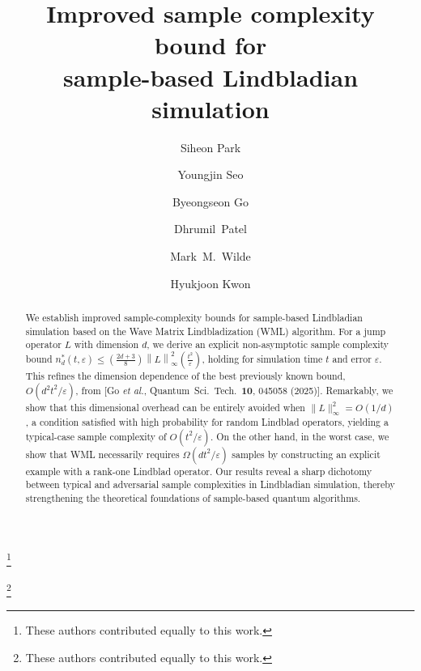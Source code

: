 \documentclass[superscriptaddress,amsmath,amssymb,aps,pra,letterpaper,tightenlines,notitlepages,12pt]{revtex4-2}
\begin{document}
\title{Improved sample complexity bound for\\sample-based Lindbladian simulation}

\author{Siheon Park}
\thanks{These authors contributed equally to this work.}

\author{Youngjin Seo}
\thanks{These authors contributed equally to this work.}

\author{Byeongseon Go}

\author{Dhrumil~Patel}

\author{Mark~M.~Wilde}

\author{Hyukjoon Kwon}


\begin{abstract}
We establish improved sample-complexity bounds for sample-based Lindbladian simulation based on the Wave Matrix Lindbladization (WML) algorithm. For a jump operator $L$ with dimension $d$, we derive an explicit non-asymptotic sample complexity bound $n_d^*(t,\varepsilon) \le \left( \frac{2d+3}{8} \right) \left\|L\right\|_\infty^2 \left( \frac{t^2}{\varepsilon} \right)$, holding for simulation time $t$ and error $\varepsilon$. This refines the dimension dependence of the best previously known bound, $O(d^2 t^2/\varepsilon)$, from [Go \textit{et al.}, Quantum~Sci.~Tech.~\textbf{10}, 045058 (2025)]. Remarkably, we show that this dimensional overhead can be entirely avoided when $\| L\|_\infty^2 = O(1/d)$, a condition satisfied with high probability for random Lindblad operators, yielding a typical-case sample complexity of $O(t^2/\varepsilon)$. On the other hand, in the worst case, we show that WML necessarily requires $\Omega(dt^2/\varepsilon)$ samples by constructing an explicit example with a rank-one Lindblad operator. Our results reveal a sharp dichotomy between typical and adversarial sample complexities in Lindbladian simulation, thereby strengthening the theoretical foundations of sample-based quantum algorithms.
\end{abstract}
\end{document}
